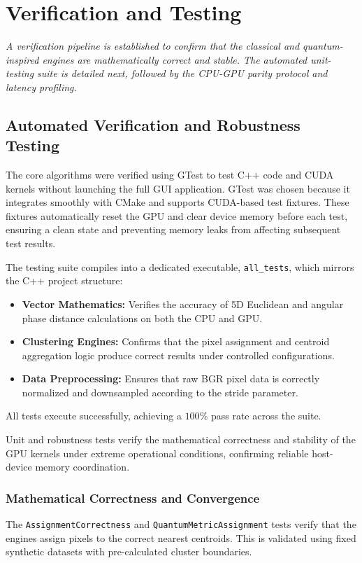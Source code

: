 \chapter{Verification and Testing}
{\itshape A verification pipeline is established to confirm that the classical and quantum-inspired engines are mathematically correct and stable. The automated unit-testing suite is detailed next, followed by the CPU-GPU parity protocol and latency profiling.}

\section{Automated Verification and Robustness Testing}
The core algorithms were verified using GTest \cite{googletest} to test C++ code and CUDA kernels without launching the full GUI application. GTest was chosen because it integrates smoothly with CMake and supports CUDA-based test fixtures. These fixtures automatically reset the GPU and clear device memory before each test, ensuring a clean state and preventing memory leaks from affecting subsequent test results.

The testing suite compiles into a dedicated executable, \texttt{all\_tests}, which mirrors the C++ project structure:
\begin{itemize}
    \item \textbf{Vector Mathematics:} Verifies the accuracy of 5D Euclidean and angular phase distance calculations on both the CPU and GPU.
    \item \textbf{Clustering Engines:} Confirms that the pixel assignment and centroid aggregation logic produce correct results under controlled configurations.
    \item \textbf{Data Preprocessing:} Ensures that raw BGR pixel data is correctly normalized and downsampled according to the stride parameter.
\end{itemize}

All tests execute successfully, achieving a $100\%$ pass rate across the suite.

Unit and robustness tests verify the mathematical correctness and stability of the GPU kernels under extreme operational conditions, confirming reliable host-device memory coordination.

\subsection{Mathematical Correctness and Convergence}
The \texttt{AssignmentCorrectness} and \texttt{QuantumMetricAssignment} tests verify that the engines assign pixels to the correct nearest centroids. This is validated using fixed synthetic datasets with pre-calculated cluster boundaries. 

